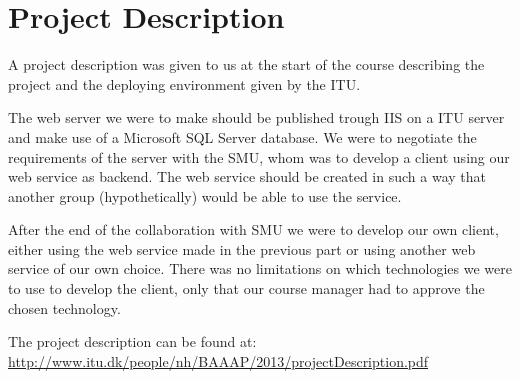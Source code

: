 \section{Project Description}
A project description was given to us at the start of the course describing the project and the deploying environment given by the ITU.

The web server we were to make should be published trough IIS on a ITU server and make use of a Microsoft SQL Server database.
We were to negotiate the requirements of the server with the SMU, whom was to develop a client using our web service as backend.
The web service should be created in such a way that another group  (hypothetically) would be able to use the service.

After the end of the collaboration with SMU we were to develop our own client, either using the web service made in the previous part or using another web service of our own choice.
There was no limitations on which technologies we were to use to develop the client, only that our course manager had to approve the chosen technology.

The project description can be found at: \url{http://www.itu.dk/people/nh/BAAAP/2013/projectDescription.pdf}
\newpage